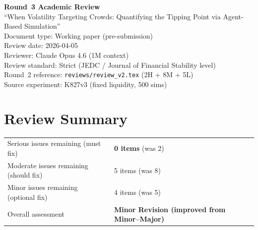 \documentclass[12pt,a4paper]{article}
\begin{document}
\begin{center}
{\Large\bfseries Round~3 Academic Review}\\[0.5em]
{\large ``When Volatility Targeting Crowds: Quantifying the Tipping Point via Agent-Based Simulation''}\\[0.5em]
{\normalsize Document type: Working paper (pre-submission)}\\
{\normalsize Review date: 2026-04-05}\\
{\normalsize Reviewer: Claude Opus 4.6 (1M context)}\\
{\normalsize Review standard: Strict (JEDC / Journal of Financial Stability level)}\\
{\normalsize Round~2 reference: \texttt{reviews/review\_v2.tex} (2H + 8M + 5L)}\\
{\normalsize Source experiment: K827v3 (fixed liquidity, 500 sims)}
\end{center}

\vspace{1em}

\section*{Review Summary}

\begin{tabular}{ll}
\textcolor{errorred}{Serious issues remaining (must fix)} & \textbf{0 items} (was 2) \\
\textcolor{warncolor}{Moderate issues remaining (should fix)} & 5 items (was 8) \\
Minor issues remaining (optional fix) & 4 items (was 5) \\
Overall assessment & \textbf{Minor Revision (improved from Minor--Major)} \\
\end{tabular}

\medskip
\end{document}
